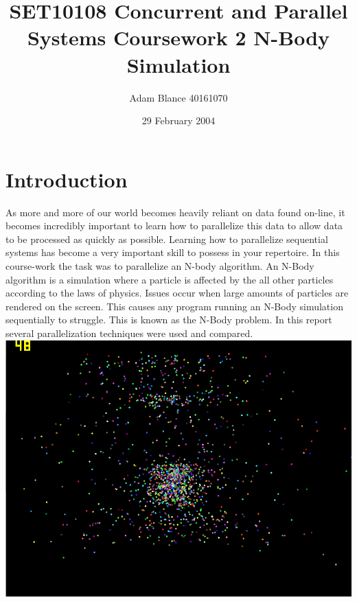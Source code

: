 \documentclass[12pt]{article}
\author{Adam Blance 40161070}
\date{29 February 2004}
\begin{document}
	\title{SET10108 Concurrent and Parallel Systems \linebreak Coursework 2 \linebreak N-Body Simulation}
	
	\maketitle
\begin{abstract}
			
\end{abstract}
	
\section{Introduction}
As more and more of our world becomes heavily reliant on data found on-line, it becomes incredibly important to learn how to parallelize this data to allow data to be processed as quickly as possible.  Learning how to parallelize sequential systems has become a very important skill to possess in your repertoire. 
\newline 
In this course-work the task was to parallelize an N-body algorithm. An N-Body algorithm is a simulation where a particle is affected by the all other particles according to the laws of physics. Issues occur when large amounts of particles are rendered on the screen. This causes any program running an N-Body simulation sequentially to struggle. This is known as the N-Body problem. In this report several
parallelization techniques were used and compared.
\newline
\includegraphics[scale=0.5]{pics/intro.png}
\end{document}

